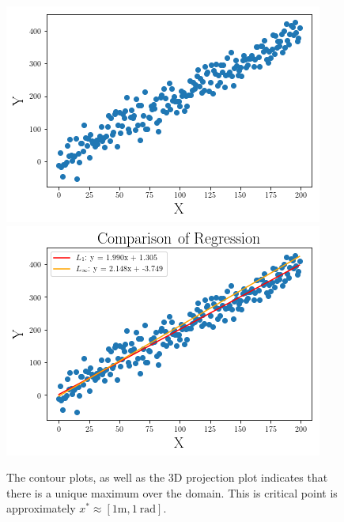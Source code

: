 \documentclass{article}
\begin{document}
\begin{figure}[h]
\includegraphics[scale = 0.6]{Line Graph.png}
\includegraphics[scale = 0.6]{Comparison.png}
\caption{The contour plots, as well as the 3D projection plot indicates that there is a unique maximum over the domain. This is critical point is approximately $x^* \approx [1 \textrm{m},1 \ \textrm{rad} ]$.}
\end{figure}
\end{document}
